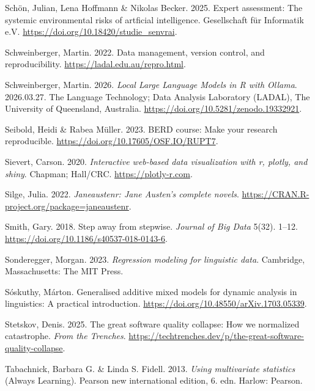 \documentclass[
  letterpaper,
  DIV=11,
  numbers=noendperiod]{scrreprt}
\newlength{\cslhangindent}
\newenvironment{CSLReferences}[2] %
 {\begin{list}{}{%
  \setlength{\itemindent}{0pt}
  \setlength{\leftmargin}{0pt}
  \setlength{\parsep}{0pt}
  \ifodd #1
   \setlength{\leftmargin}{\cslhangindent}
   \setlength{\itemindent}{-1\cslhangindent}
  \fi
  \setlength{\itemsep}{#2\baselineskip}}}
 {\end{list}}
\begin{document}
\begin{CSLReferences}{1}{0}
Schön, Julian, Lena Hoffmann \& Nikolas Becker. 2025. Expert assessment:
The systemic environmental risks of artficial intelligence. Gesellschaft
für Informatik e.V. \url{https://doi.org/10.18420/studie_senvrai}.

Schweinberger, Martin. 2022. Data management, version control, and
reproducibility. \url{https://ladal.edu.au/repro.html}.

Schweinberger, Martin. 2026. \emph{Local {Large} {Language} {Models} in
{R} with {Ollama}}. 2026.03.27. The Language Technology; Data Analysis
Laboratory (LADAL), The University of Queensland, Australia.
\url{https://doi.org/10.5281/zenodo.19332921}.

Seibold, Heidi \& Rabea Müller. 2023. BERD course: Make your research
reproducible. \url{https://doi.org/10.17605/OSF.IO/RUPT7}.

Sievert, Carson. 2020. \emph{Interactive web-based data visualization
with r, plotly, and shiny}. Chapman; Hall/CRC.
\url{https://plotly-r.com}.

Silge, Julia. 2022. \emph{Janeaustenr: Jane {Austen}'s complete novels}.
\url{https://CRAN.R-project.org/package=janeaustenr}.

Smith, Gary. 2018. Step away from stepwise. \emph{Journal of Big Data}
5(32). 1--12. \url{https://doi.org/10.1186/s40537-018-0143-6}.

Sonderegger, Morgan. 2023. \emph{Regression modeling for linguistic
data}. Cambridge, Massachusetts: The MIT Press.

Sóskuthy, Márton. Generalised additive mixed models for dynamic analysis
in linguistics: A practical introduction.
\url{https://doi.org/10.48550/arXiv.1703.05339}.

Stetskov, Denis. 2025. The great software quality collapse: How we
normalized catastrophe. \emph{From the Trenches}.
\url{https://techtrenches.dev/p/the-great-software-quality-collapse}.

Tabachnick, Barbara G. \& Linda S. Fidell. 2013. \emph{Using
multivariate statistics} (Always Learning). Pearson new international
edition, 6. edn. Harlow: Pearson.


\end{CSLReferences}
\end{document}
